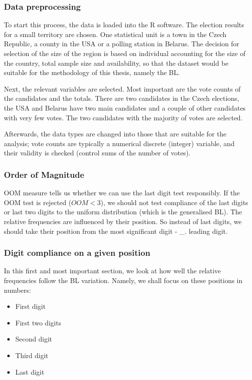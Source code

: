 \subsubsection{Data preprocessing}

To start this process, the data is loaded into the R software. The election results for a small territory are chosen. One statistical unit is a town in the Czech Republic, a county in the USA or a polling station in Belarus. The decision for selection of the size of the region is based on individual accounting for the size of the country, total sample size and availability, so that the dataset would be suitable for the methodology of this thesis, namely the BL.

Next, the relevant variables are selected. Most important are the vote counts of the candidates and the totals. There are two candidates in the Czech elections, the USA and Belarus have two main candidates and a couple of other candidates with very few votes. The two candidates with the majority of votes are selected. 

Afterwards, the data types are changed into those that are suitable for the analysis; vote counts are typically a numerical discrete (integer) variable, and their validity is checked (control sums of the number of votes). 

\subsubsection{Order of Magnitude}

OOM measure tells us whether we can use the last digit test responsibly. If the OOM test is rejected ($OOM < 3$), we should not test compliance of the last digits or last two digits to the uniform distribution (which is the generalised BL). The relative frequencies are influenced by their position. So instead of last digits, we should take their position from the most significant digit - \_. leading digit. 

\subsubsection{Digit compliance on a given position} 

In this first and most important section, we look at how well the relative frequencies follow the BL variation. Namely, we shall focus on these positions in numbers: 

\begin{itemize}
    \item First digit 
    \item First two digits 
    \item Second digit 
    \item Third digit 
    \item Last digit
\end{itemize}


